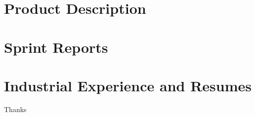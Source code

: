 \documentclass{book}
\begin{document}
\appendix

\chapter{Product Description}


%

\chapter{Sprint Reports}


\chapter{Industrial Experience and Resumes}


Thanks  

%

\backmatter

%

%
\end{document}
